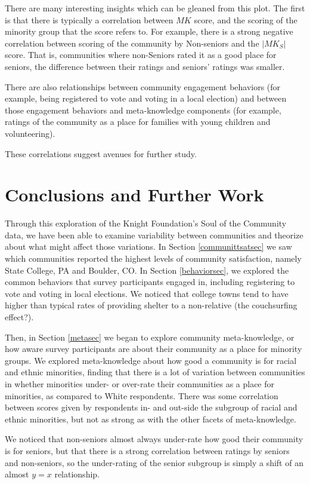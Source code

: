 \documentclass[smallextended]{svjour3}\usepackage[]{graphicx}\usepackage[]{color}
\begin{document}
There are many interesting insights which can be gleaned from this plot. The first is that there is typically a correlation between $MK$ score, and the scoring of the minority group that the score refers to. For example, there is a strong negative correlation between scoring of the community by Non-seniors and the $|MK_S|$ score. That is, communities where non-Seniors rated it as a good place for seniors, the difference between their ratings and seniors' ratings was smaller. 

There are also relationships between community engagement behaviors (for example, being registered to vote and voting in a local election) and between those engagement behaviors and meta-knowledge components (for example, ratings of the community as a place for families with young children and volunteering). 

These correlations suggest avenues for further study. 

\section{Conclusions and Further Work}
Through this exploration of the Knight Foundation's Soul of the Community data, we have been able to examine variability between communities and theorize about what might affect those variations. In Section \ref{communittsatsec} we saw which communities reported the highest levels of community satisfaction, namely State College, PA and Boulder, CO. In Section \ref{behaviorsec}, we explored the common behaviors that survey participants engaged in, including registering to vote and voting in local elections. We noticed that college towns tend to have higher than typical rates of providing shelter to a non-relative (the couchsurfing effect?).

Then, in Section \ref{metasec} we began to explore community meta-knowledge, or how aware survey participants are about their community as a place for minority groups. We explored meta-knowledge about how good a community is for racial and ethnic minorities, finding that there is a lot of variation between communities in whether minorities under- or over-rate their communities as a place for minorities, as compared to White respondents. There was some correlation between scores given by respondents in- and out-side the subgroup of racial and ethnic minorities, but not as strong as with the other facets of meta-knowledge. 

We noticed that non-seniors almost always under-rate how good their community is for seniors, but that there is a strong correlation between ratings by seniors and non-seniors, so the under-rating of the senior subgroup is simply a shift of an almost $y=x$ relationship. 
\end{document}
